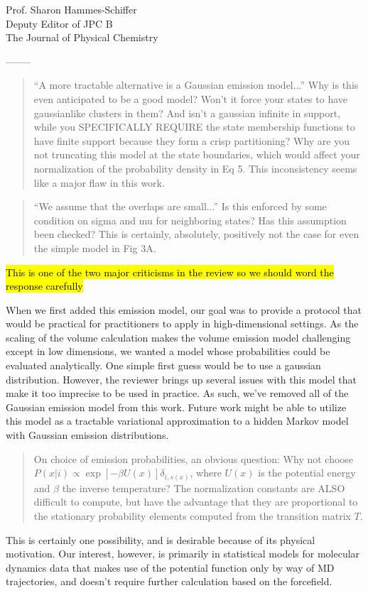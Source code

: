 \documentclass{letter}
\newcommand{\separate}{\begin{center}--------\end{center}}
\begin{document}
\begin{letter}{Prof. Sharon Hammes-Schiffer \\ Deputy Editor of JPC B \\ The Journal of Physical Chemistry}
\separate
\begin{quote}
``A more tractable alternative is a Gaussian emission model...''  Why is this even anticipated to be a good model?  Won't it force your states to have gaussianlike clusters in them?  And isn't a gaussian infinite in support, while you SPECIFICALLY REQUIRE the state membership functions to have finite support because they form a crisp partitioning?  Why are you not truncating this model at the state boundaries, which would affect your normalization of the probability density in Eq 5.  This inconsistency seems like a major flaw in this work.
\end{quote}

\begin{quote}
``We assume that the overlaps are small...''  Is this enforced by some condition on sigma and mu for neighboring states?  Has this assumption been checked?  This is certainly, absolutely, positively not the case for even the simple model in Fig 3A.
\end{quote}

\hl{This is one of the two major criticisms in the review so we should word the response carefully}

When we first added this emission model, our goal was to provide a protocol that would be practical for practitioners to apply in high-dimensional settings. As the scaling of the volume calculation makes the volume emission model challenging except in low dimensions, we wanted a model whose probabilities could be evaluated analytically. One simple first guess would be to use a gaussian distribution. However, the reviewer brings up several issues with this model that make it too imprecise to be used in practice. As such, we've removed all of the Gaussian emission model from this work. Future work might be able to utilize this model as a tractable variational approximation to a hidden Markov model with Gaussian emission distributions.

\begin{quote}
On choice of emission probabilities, an obvious question: Why not choose $P(x|i) \propto \exp[-\beta U(x)] \delta_{i,s(x)}$, where $U(x)$ is the potential energy and $\beta$ the inverse temperature?  The normalization constants are ALSO difficult to compute, but have the advantage that they are proportional to the stationary probability elements computed from the transition matrix $T$.
\end{quote}

This is certainly one possibility, and is desirable because of its physical motivation. Our interest, however, is primarily in statistical models for molecular dynamics data that makes use of the potential function only by way of MD trajectories, and doesn't require further calculation based on the forcefield.



\end{letter}
\end{document}
